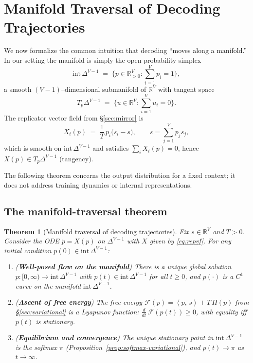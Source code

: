 \documentclass[10pt,a4paper]{amsart}
\numberwithin{equation}{section}
\theoremstyle{plain}
\newtheorem{theorem}{Theorem}[section]
\theoremstyle{definition}
\theoremstyle{remark}
\newcommand{\R}{\mathbb{R}}
\newcommand{\1}{\mathbbm{1}}
\newcommand{\ip}[2]{\left\langle #1,\, #2 \right\rangle}
\newcommand{\Hent}{H}
\newcommand{\simplex}{\Delta^{V-1}}
\newcommand{\avgscore}{\bar{s}}
\begin{document}
\section{Manifold Traversal of Decoding Trajectories}\label{sec:manifold}

We now formalize the common intuition that decoding ``moves along a manifold.'' In our setting the manifold is simply the open probability simplex
\[
\mathrm{int}\,\simplex \;=\; \Big\{p\in\R^V_{>0} : \sum_{i=1}^V p_i = 1\Big\},
\]
a smooth $(V-1)$–dimensional submanifold of $\R^V$ with tangent space
\[
T_p\simplex \;=\; \Big\{ u\in\R^V : \sum_{i=1}^V u_i = 0 \Big\}.
\]
The replicator vector field from \S\ref{sec:mirror} is
\begin{equation}\label{eq:repvf}
X_i(p)\;=\;\frac{1}{T}\,p_i\big(s_i-\avgscore\big),\qquad \avgscore=\sum_{j=1}^V p_j s_j,
\end{equation}
which is smooth on $\mathrm{int}\,\simplex$ and satisfies $\sum_i X_i(p)=0$, hence $X(p)\in T_p\simplex$ (tangency).

The following theorem concerns the output distribution for a fixed context; it does not address training dynamics or internal representations.


\subsection{The manifold-traversal theorem}

\begin{theorem}[Manifold traversal of decoding trajectories]\label{thm:manifold}
Fix $s\in\R^V$ and $T>0$. Consider the ODE $\dot p = X(p)$ on $\simplex$ with $X$ given by \eqref{eq:repvf}.
For any initial condition $p(0)\in \mathrm{int}\,\simplex$:
\begin{enumerate}
    \item (\textbf{Well-posed flow on the manifold}) There is a unique global solution $p:[0,\infty)\to \mathrm{int}\,\simplex$ with $p(t)\in\mathrm{int}\,\simplex$ for all $t\ge 0$, and $p(\cdot)$ is a $C^1$ curve on the manifold $\mathrm{int}\,\simplex$.
    \item (\textbf{Ascent of free energy}) The free energy $\mathcal{F}(p)=\ip{p}{s}+T\,\Hent(p)$ from \S\ref{sec:variational} is a Lyapunov function: $\frac{d}{dt}\,\mathcal{F}(p(t))\ge 0$, with equality iff $p(t)$ is stationary.
    \item (\textbf{Equilibrium and convergence}) The unique stationary point in $\mathrm{int}\,\simplex$ is the softmax $\pi$ (Proposition~\ref{prop:softmax-variational}), and $p(t)\to \pi$ as $t\to\infty$.
\end{enumerate}
\end{theorem}
\end{document}
